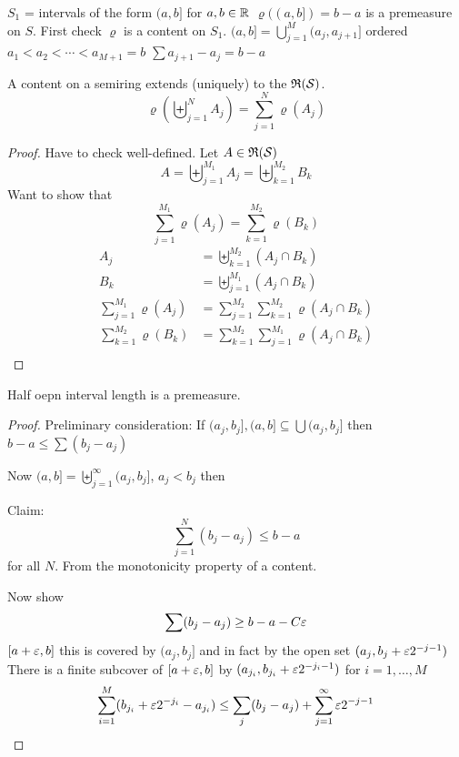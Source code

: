 \begin{example}
  $S_1$ = intervals of the form $(a, b]$ for $a, b\in \mathbb R$
  $\varrho((a, b]) = b-a$ is a premeasure on $S$.
  First check $\varrho$ is a content on $S_1$.
  $(a, b] = \bigcup_{j=1}^M (a_j, a_{j+1}]$ ordered $a_1 < a_2 < \dotsm < a_{M+1} = b$
  $\sum a_{j+1} - a_j = b-a$
\end{example}


\begin{theorem}
  A content on a semiring extends (uniquely) to the $\mathfrak R(\mathcal S)$. 
  \[\varrho\left(\biguplus_{j=1}^N A_j\right) = \sum_{j=1}^N \varrho(A_j)\]
\end{theorem}

\begin{proof}
  Have to check well-defined.  
  Let $A \in \mathfrak R(\mathcal S)$
  \[A = \biguplus_{j=1}^{M_1} A_j = \biguplus_{k=1}^{M_2} B_k \]
  Want to show that
  \[\sum_{j=1}^{M_1} \varrho(A_j) = \sum_{k=1}^{M_2} \varrho(B_k)\]
  \begin{align*}
    A_j &= \biguplus_{k=1}^{M_2} (A_j \cap B_k) \\
    B_k &= \biguplus_{j=1}^{M_1} (A_j \cap B_k) \\
    \sum_{j=1}^{M_1} \varrho(A_j) &= \sum_{j=1}^{M_2} \sum_{k=1}^{M_2} \varrho(A_j \cap B_k) \\
    \sum_{k=1}^{M_2} \varrho(B_k) &= \sum_{k=1}^{M_2} \sum_{j=1}^{M_1} \varrho(A_j \cap B_k) \\
  \end{align*}
\end{proof}

\begin{claim}
  Half oepn interval length is a premeasure.
\end{claim}
\begin{proof}
  
Preliminary consideration: If $(a_j, b_j], (a, b] \subseteq \bigcup(a_j, b_j]$ then
$b-a \le \sum (b_j - a_j)$

Now $(a, b] = \biguplus_{j=1}^\infty (a_j, b_j]$, $a_j < b_j$ then 

Claim:
\[\sum_{j=1}^N (b_j - a_j) \le b-a\]
for all $N$. From the monotonicity property of a content.

Now show 
\[\sum (b_j - a_j) \ge b-a-C\varepsilon\]
$[a+\varepsilon, b]$ this is covered by $(a_j, b_j]$
and in fact by the open set $(a_j, b_j + \varepsilon 2^{-j-1})$
There is a finite subcover of $[a + \varepsilon, b]$ by $(a_{j_i}, b_{j_i} + \varepsilon 2^{-j_i-1})$ for $i = 1, \dotsc, M$
$$\sum_{i=1}^M (b_{j_i} + \varepsilon 2^{-j_i} - a_{j_i}) \le \sum_{j} (b_j - a_j) + \sum_{j=1}^\infty \varepsilon2^{-j-1}$$

\end{proof}

